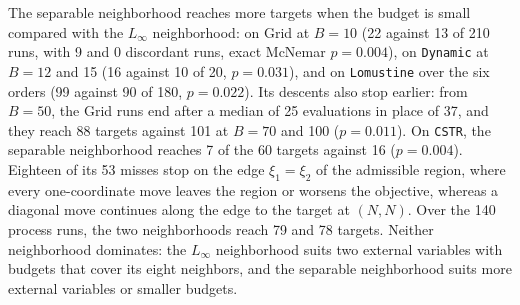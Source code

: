 The separable neighborhood reaches more targets when the budget is small compared with the \(L_\infty\) neighborhood: on Grid at \(B=10\) (22 against 13 of 210 runs, with 9 and 0 discordant runs, exact McNemar \(p=0.004\)), on \texttt{Dynamic} at \(B=12\) and 15 (16 against 10 of 20, \(p=0.031\)), and on \texttt{Lomustine} over the six orders (99 against 90 of 180, \(p=0.022\)).
Its descents also stop earlier: from \(B=50\), the Grid runs end after a median of 25 evaluations in place of 37, and they reach 88 targets against 101 at \(B=70\) and 100 (\(p=0.011\)).
On \texttt{CSTR}, the separable neighborhood reaches 7 of the 60 targets against 16 (\(p=0.004\)).
Eighteen of its 53 misses stop on the edge \(\xi_1=\xi_2\) of the admissible region, where every one-coordinate move leaves the region or worsens the objective, whereas a diagonal move continues along the edge to the target at \((N,N)\).
Over the 140 process runs, the two neighborhoods reach 79 and 78 targets.
Neither neighborhood dominates: the \(L_\infty\) neighborhood suits two external variables with budgets that cover its eight neighbors, and the separable neighborhood suits more external variables or smaller budgets.

